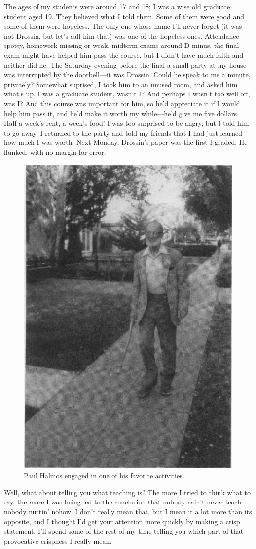 \documentclass[a4paper,12pt]{article}
\begin{document}
The ages of my students were around 17 and 18; I was a wise old
graduate student aged 19.  They believed what I told them.  Some of
them were good and some of them were hopeless.  The only one whose
name I’ll never forget (it was not Drossin, but let’s call him that)
was one of the hopeless ones.  Attendance spotty, homework missing or
weak, midterm exams around D minus, the final exam might have helped
him pass the course, but I didn’t have much faith and neither did he.
The Saturday evening before the final a small party at my house was
interrupted by the doorbell—it was Drossin.  Could he speak to me a
minute, privately?  Somewhat suprised, I took him to an unused room,
and asked him what’s up.  I was a graduate student, wasn’t I?  And
perhaps I wasn’t too well off, was I?  And this course was important
for him, so he’d appreciate it if I would help him pass it, and he’d
make it worth my while—he’d give me five dollars.  Half a week’s rent,
a week’s food!  I was too surprised to be angry, but I told him to go
away.  I returned to the party and told my friends that I had just
learned how much I was worth.  Next Monday, Drossin’s paper was the
first I graded.  He flunked, with no margin for error.

\begin{figure}[htbp]
\centering
\includegraphics[width=.54\linewidth]{Halmos-Walking.png}
\caption*{\label{fig:halmos-walking}Paul Halmos engaged in one of his favorite activities.}
\end{figure}

Well, what about telling you what teaching is?  The more I tried to
think what to say, the more I was being led to the conclusion that
nobody cain’t never teach nobody nuttin’ nohow.  I don’t really mean
that, but I mean it a lot more than its opposite, and I thought I’d
get your attention more quickly by making a crisp statement.  I’ll
spend some of the rest of my time telling you which part of that
provocative crispness I really mean.
\end{document}
